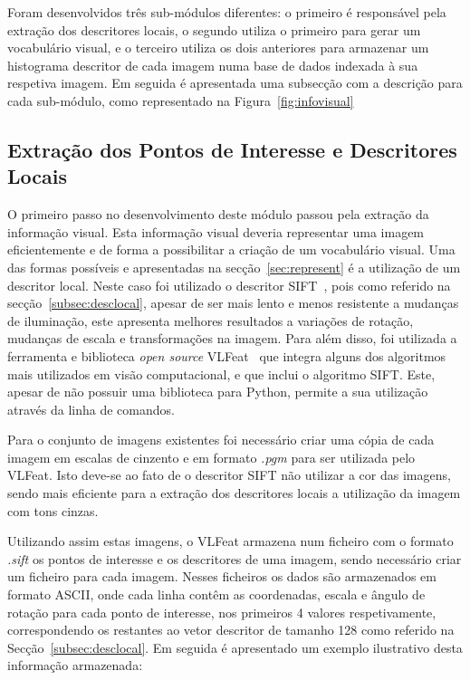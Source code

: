 Foram desenvolvidos três sub-módulos diferentes: o primeiro é responsável pela extração dos descritores locais, o segundo utiliza o primeiro para gerar um vocabulário visual, e o terceiro utiliza os dois anteriores para armazenar um histograma descritor de cada imagem numa base de dados indexada à sua respetiva imagem. 
Em seguida é apresentada uma subsecção com a descrição para cada sub-módulo, como representado na Figura~\ref{fig:infovisual}

\subsection{Extração dos Pontos de Interesse e Descritores Locais}

O primeiro passo no desenvolvimento deste módulo passou pela extração da informação visual. Esta informação visual deveria representar uma imagem eficientemente e de forma a possibilitar a criação de um vocabulário visual. Uma das formas possíveis e apresentadas na secção~\ref{sec:represent} é a utilização de um descritor local. Neste caso foi utilizado o descritor SIFT~\cite{Lowe1999, Lowe2004}, pois como referido na secção~\ref{subsec:desclocal}, apesar de ser mais lento e menos resistente a mudanças de iluminação, este apresenta melhores resultados a variações de rotação, mudanças de escala e transformações na imagem. Para além disso, foi utilizada a ferramenta e biblioteca \textit{open source} VLFeat~\cite{vedaldi08vlfeat} que integra alguns dos algoritmos mais utilizados em visão computacional, e que inclui o algoritmo SIFT. Este, apesar de não possuir uma biblioteca para Python, permite a sua utilização através da linha de comandos.

Para o conjunto de imagens existentes foi necessário criar uma cópia de cada imagem em escalas de cinzento e em formato \textit{.pgm} para ser utilizada pelo VLFeat. Isto deve-se ao fato de o descritor SIFT não utilizar a cor das imagens, sendo mais eficiente para a extração dos descritores locais a utilização da imagem com tons cinzas. 

Utilizando assim estas imagens, o VLFeat armazena num ficheiro com o formato \textit{.sift} os pontos de interesse e os descritores de uma imagem, sendo necessário criar um ficheiro para cada imagem. Nesses ficheiros os dados são armazenados em formato ASCII, onde cada linha contêm as coordenadas, escala e ângulo de rotação para cada ponto de interesse, nos primeiros 4 valores respetivamente, correspondendo os restantes ao vetor descritor de tamanho 128 como referido na Secção~\ref{subsec:desclocal}. Em seguida é apresentado um exemplo ilustrativo desta informação armazenada:

